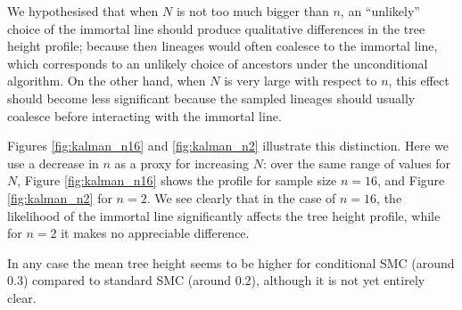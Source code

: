 \documentclass{article}
\begin{document}
We hypothesised that when $N$ is not too much bigger than $n$, an ``unlikely'' choice of the immortal line should produce qualitative differences in the tree height profile; because the$n$ lineages would often coalesce to the immortal line, which corresponds to an unlikely choice of ancestors under the unconditional algorithm. On the other hand, when $N$ is very large with respect to $n$, this effect should become less significant because the sampled lineages should usually coalesce before interacting with the immortal line.

Figures \ref{fig:kalman_n16} and \ref{fig:kalman_n2} illustrate this distinction. Here we use a decrease in $n$ as a proxy for increasing $N$: over the same range of values for $N$, Figure \ref{fig:kalman_n16} shows the profile for sample size $n=16$, and Figure \ref{fig:kalman_n2} for $n=2$.
We see clearly that in the case of $n=16$, the likelihood of the immortal line significantly affects the tree height profile, while for $n=2$ it makes no appreciable difference.

In any case the mean tree height seems to be higher for conditional SMC (around 0.3) compared to standard SMC (around 0.2), although it is not yet entirely clear.
\end{document}
